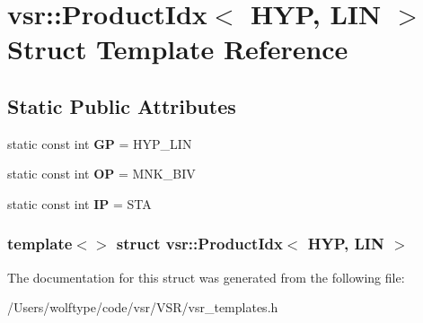 \hypertarget{structvsr_1_1_product_idx_3_01_h_y_p_00_01_l_i_n_01_4}{\section{vsr\-:\-:Product\-Idx$<$ H\-Y\-P, L\-I\-N $>$ Struct Template Reference}
\label{structvsr_1_1_product_idx_3_01_h_y_p_00_01_l_i_n_01_4}
}
\subsection*{Static Public Attributes}
\begin{DoxyCompactItemize}
\item 
\hypertarget{structvsr_1_1_product_idx_3_01_h_y_p_00_01_l_i_n_01_4_a7cf60bdcd64ecdeda43556a033749136}{static const int {\bfseries G\-P} = H\-Y\-P\-\_\-\-L\-I\-N}\label{structvsr_1_1_product_idx_3_01_h_y_p_00_01_l_i_n_01_4_a7cf60bdcd64ecdeda43556a033749136}

\item 
\hypertarget{structvsr_1_1_product_idx_3_01_h_y_p_00_01_l_i_n_01_4_ace0a0cb8e8a15aface5d14c72d15c701}{static const int {\bfseries O\-P} = M\-N\-K\-\_\-\-B\-I\-V}\label{structvsr_1_1_product_idx_3_01_h_y_p_00_01_l_i_n_01_4_ace0a0cb8e8a15aface5d14c72d15c701}

\item 
\hypertarget{structvsr_1_1_product_idx_3_01_h_y_p_00_01_l_i_n_01_4_abb3a77419923f70e6d225942c6141c9b}{static const int {\bfseries I\-P} = S\-T\-A}\label{structvsr_1_1_product_idx_3_01_h_y_p_00_01_l_i_n_01_4_abb3a77419923f70e6d225942c6141c9b}

\end{DoxyCompactItemize}
\subsubsection*{template$<$$>$ struct vsr\-::\-Product\-Idx$<$ H\-Y\-P, L\-I\-N $>$}



The documentation for this struct was generated from the following file\-:\begin{DoxyCompactItemize}
\item 
/\-Users/wolftype/code/vsr/\-V\-S\-R/vsr\-\_\-templates.\-h\end{DoxyCompactItemize}
